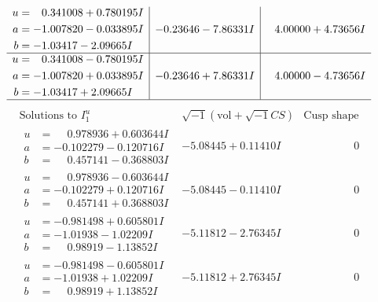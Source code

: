 \documentclass[1p]{elsarticle_modified}
\theoremstyle{definition}
\newcommand{\I}{\sqrt{-1}}
\begin{document}
$$\begin{array}{c|c|c}
\begin{aligned}
u &= \phantom{-}0.341008 + 0.780195 I \\
a &= -1.007820 - 0.033895 I \\
b &= -1.03417 - 2.09665 I\end{aligned}
 & -0.23646 - 7.86331 I & \phantom{-}4.00000 + 4.73656 I \\ \hline\begin{aligned}
u &= \phantom{-}0.341008 - 0.780195 I \\
a &= -1.007820 + 0.033895 I \\
b &= -1.03417 + 2.09665 I\end{aligned}
 & -0.23646 + 7.86331 I & \phantom{-}4.00000 - 4.73656 I\\
 \hline 
 \end{array}$$\newpage$$\begin{array}{c|c|c}  
\text{Solutions to }I^u_{1}& \I (\text{vol} + \sqrt{-1}CS) & \text{Cusp shape}\\
 \hline 
\begin{aligned}
u &= \phantom{-}0.978936 + 0.603644 I \\
a &= -0.102279 - 0.120716 I \\
b &= \phantom{-}0.457141 - 0.368803 I\end{aligned}
 & -5.08445 + 0.11410 I & \phantom{-0.000000 } 0 \\ \hline\begin{aligned}
u &= \phantom{-}0.978936 - 0.603644 I \\
a &= -0.102279 + 0.120716 I \\
b &= \phantom{-}0.457141 + 0.368803 I\end{aligned}
 & -5.08445 - 0.11410 I & \phantom{-0.000000 } 0 \\ \hline\begin{aligned}
u &= -0.981498 + 0.605801 I \\
a &= -1.01938 - 1.02209 I \\
b &= \phantom{-}0.98919 - 1.13852 I\end{aligned}
 & -5.11812 - 2.76345 I & \phantom{-0.000000 } 0 \\ \hline\begin{aligned}
u &= -0.981498 - 0.605801 I \\
a &= -1.01938 + 1.02209 I \\
b &= \phantom{-}0.98919 + 1.13852 I\end{aligned}
 & -5.11812 + 2.76345 I & \phantom{-0.000000 } 0 \\ \hline\begin{aligned}

\end{aligned}
\end{array}$$
\end{document}
